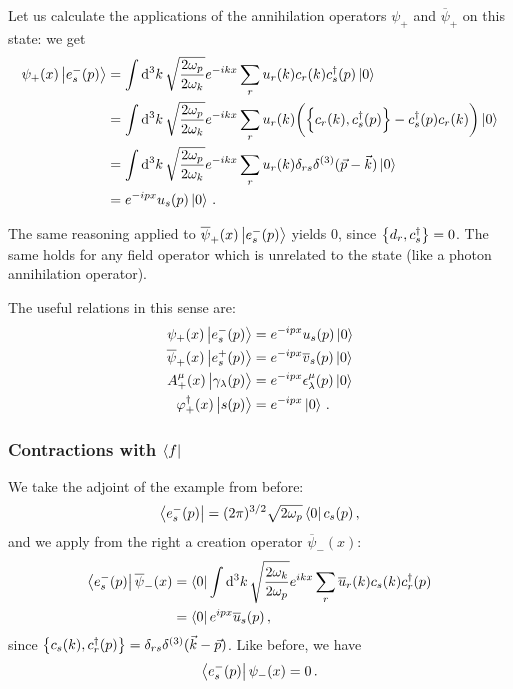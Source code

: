 \documentclass[main.tex]{subfiles}
\begin{document}
Let us calculate the applications 
of the annihilation operators \(\psi_{+}\) and \(\overline{\psi}_{+}\) on this state: we get 
%
\begin{align}
\psi_{+} (x) \ket{e^{-}_{s} (p)}
&= \int \dd[3]{k} \sqrt{\frac{2 \omega_{p}}{2 \omega_{k}}}
e^{-ikx} \sum_{r} u_r (k) c_r (k) c_s ^\dag (p) \ket{0}  \\
&= \int \dd[3]{k} \sqrt{\frac{2 \omega_{p}}{2 \omega_{k}}}
e^{-ikx} \sum_{r} u_r (k) \qty(\qty{ c_r (k), c_s ^\dag (p)} - c_s ^\dag (p) c_r (k)) \ket{0}  \\
&= \int \dd[3]{k} \sqrt{\frac{2 \omega_{p}}{2 \omega_{k}}}
e^{-ikx} \sum_{r} u_r (k) \delta_{rs} \delta^{(3)}(\vec{p} - \vec{k}) \ket{0}  \\
&= e^{-ipx} u_s (p) \ket{0}
\,.
\end{align}

The same reasoning applied to \(\overline{\psi}_{+}(x) \ket{e^{-}_{s}(p)}\) yields 0, since \(\qty{d_r, c_s ^\dag }= 0\). 
The same holds for any field operator which is unrelated to the state (like a photon annihilation operator). 

The useful relations in this sense are: 
%
\begin{align}
\psi_{+} (x) \ket{e^{-}_{s} (p)} &= e^{-ipx} u_s (p) \ket{0} \\
\overline{\psi}_{+} (x) \ket{e^{+}_{s} (p)} &= e^{-ipx} \overline{v}_s (p) \ket{0}  \\
A^{\mu }_{+} (x) \ket{\gamma_{\lambda } (p)} &= e^{-ipx} \epsilon^{\mu }_{\lambda } (p)\ket{0}  \\
\varphi ^\dag_{+} (x) \ket{s(p)} &= e^{-ipx} \ket{0} 
\,.
\end{align}

\subsubsection{Contractions with \(\bra{f}\)}

We take the adjoint of the example from before: 
%
\begin{align}
\bra{e^{-}_{s} (p)} = (2 \pi)^{3/2} \sqrt{2 \omega_{p}}
\bra{0} c_s (p)
\,,
\end{align}
%
and we apply from the right a creation operator \(\overline{\psi}_{-}(x)\): 
%
\begin{align}
\bra{e^{-}_{s}(p)}
\overline{\psi}_{-}(x)
&= \bra{0} \int \dd[3]{k}
\sqrt{ \frac{2 \omega_{k}}{2 \omega_{p}}}
e^{ikx} \sum _{r} \overline{u}_{r} (k) c_s (k) c_r ^\dag (p)  \\
&= \bra{0} e^{ipx} \overline{u}_{s} (p)
\,,
\end{align}
%
since \(\qty{c_s (k), c_r ^\dag (p)} = \delta_{rs} \delta^{(3)}(\vec{k} - \vec{p})\). Like before, we have 
%
\begin{align}
\bra{e^{-}_{s}(p)} \psi_{-} (x) = 0
\,.
\end{align}
\end{document}
